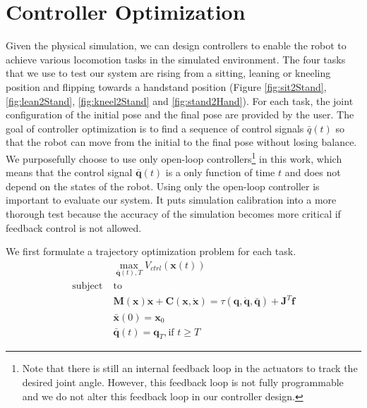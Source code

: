 \section{Controller Optimization}

Given the physical simulation, we can design controllers to enable the robot to achieve various locomotion tasks in the simulated environment. The four tasks that we use to test our system are rising from a sitting, leaning or kneeling position and flipping towards a handstand position (Figure \ref{fig:sit2Stand}, \ref{fig:lean2Stand}, \ref{fig:kneel2Stand} and \ref{fig:stand2Hand}). For each task, the joint configuration of the initial pose and the final pose are provided by the user. The goal of controller optimization is to find a sequence of control signals $\bar{q}(t)$ so that the robot can move from the initial to the final pose without losing balance. We purposefully choose to use only open-loop controllers\footnote{Note that there is still an internal feedback loop in the actuators to track the desired joint angle. However, this feedback loop is not fully programmable and we do not alter this feedback loop in our controller design.} in this work, which means that the control signal $\bar{\mathbf{q}}(t)$ is a only function of time $t$ and does not depend on the states of the robot. Using only the open-loop controller is important to evaluate our system. It puts simulation calibration into a more thorough test because the accuracy of the simulation becomes more critical if feedback control is not allowed.

We first formulate a trajectory optimization problem for each task.
\begin{align}
 \label{eqn:obj}&\max_{\bar{\mathbf{q}}(t),T} V_{ctrl}(\mathbf{x}(t))\\
\nonumber  \mathrm{subject\;} &\mathrm{to} \\
\label{eqn:dyn1} & \mathbf{M}(\mathbf{x})\mathbf{\ddot{x}}+\mathbf{C}(\mathbf{x},\mathbf{\dot{x}}) =\tau(\mathbf{q}, \dot{\mathbf{q}}, \bar{\mathbf{q}}) + \mathbf{J}^T\mathbf{f}\\
\label{eqn:boundary1}&\bar{\mathbf{x}}(0) = \mathbf{x}_0\\
\label{eqn:boundary2}&\bar{\mathbf{q}}(t) = \mathbf{q}_T, \text{if } t \geq T
\end{align}

